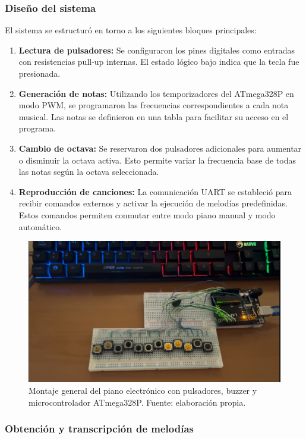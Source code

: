 \subsubsection{Diseño del sistema}
El sistema se estructuró en torno a los siguientes bloques principales:
\begin{enumerate}
    \item \textbf{Lectura de pulsadores:} Se configuraron los pines digitales como entradas con resistencias pull-up internas. El estado lógico bajo indica que la tecla fue presionada.
    \item \textbf{Generación de notas:} Utilizando los temporizadores del ATmega328P en modo PWM, se programaron las frecuencias correspondientes a cada nota musical. Las notas se definieron en una tabla para facilitar su acceso en el programa.
    \item \textbf{Cambio de octava:} Se reservaron dos pulsadores adicionales para aumentar o disminuir la octava activa. Esto permite variar la frecuencia base de todas las notas según la octava seleccionada.
    \item \textbf{Reproducción de canciones:} La comunicación UART se estableció para recibir comandos externos y activar la ejecución de melodías predefinidas. Estos comandos permiten conmutar entre modo piano manual y modo automático.
\end{enumerate}

\begin{figure}[H]
    \centering
    \includegraphics[width=0.8\columnwidth]{Anexos/Conexionado_Piano.png}
    \caption{Montaje general del piano electrónico con pulsadores, buzzer y microcontrolador ATmega328P. Fuente: elaboración propia.}
    \label{fig:piano_conexion}
\end{figure}


\subsubsection{Obtención y transcripción de melodías}

